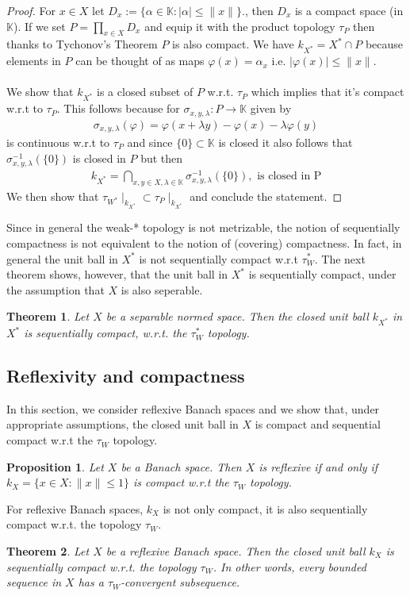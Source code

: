 \documentclass[11pt,a4paper]{article}
\newtheorem{thm}{Theorem}[section]
\newtheorem{prop}{Proposition}[section]
\theoremstyle{definition}
\begin{document}
\begin{proof}
For $x \in X$ let $D_x:= \lbrace \alpha \in \mathbb{K}: | \alpha | \leq \|x\| \rbrace$., then $D_x$ is a compact space (in $\mathbb{K}$). If we set $P= \prod_{x \in X} D_x$ and equip it with the product topology $\tau_P$ then thanks to Tychonov's Theorem $P$ is also compact. We have $k_{X^*} = X^* \cap P$ because elements in $P$ can be thought of as maps $\varphi(x)= \alpha_x$ i.e. $| \varphi(x)| \leq \|x\|$. \\\\
We show that $k_{X^*}$ is a closed subset of $P$ w.r.t. $\tau_P$ which implies that it's compact w.r.t to $\tau_P$. This follows because for $\sigma_{x,y, \lambda}:P \to \mathbb{K}$ given by 
\begin{align*}
\sigma_{x,y, \lambda} ( \varphi)= \varphi(x+ \lambda y)- \varphi(x)- \lambda \varphi(y)
\end{align*}
is continuous w.r.t to $\tau_P$ and since $\lbrace 0 \rbrace \subset \mathbb{K}$ is closed it also follows that $\sigma_{x,y, \lambda}^{-1}( \{0 \})$ is closed in $P$ but then 
\begin{align*}
k_{X^*} = \bigcap_{x,y \in X, \lambda \in \mathbb{K}} \sigma_{x,y, \lambda}^{-1}(\{0 \}), \text{ is closed in P}
\end{align*}
We then show that $ \tau_{W^*} \mid_{k_{X^*}} \subset \tau_P \mid_{k_{X^*}}$ and conclude the statement. 
\end{proof}
\noindent Since in general the weak-* topology is not metrizable, the notion of sequentially compactness is not equivalent to the notion of (covering) compactness. In fact, in general the unit ball in $X^*$ is not sequentially compact w.r.t $\tau_W^*$. The next theorem shows, however, that the unit ball in $X^*$ is sequentially compact, under the assumption that $X$ is also seperable. 
\begin{thm} Let $X$ be a separable normed space. Then the closed unit ball $k_{X^*}$ in $X^*$ is sequentially compact, w.r.t. the $\tau_W^*$ topology. 
\end{thm}
\subsection{Reflexivity and compactness}
In this section, we consider reflexive Banach spaces and we show that, under appropriate assumptions, the closed unit ball in $X$ is compact and sequential compact w.r.t the $\tau_W$ topology. 
\begin{prop} Let $X$ be a Banach space. Then $X$ is reflexive if and only if $k_X= \lbrace x \in X : \|x\| \leq 1\rbrace$ is compact w.r.t the $\tau_W$ topology. 
\end{prop}
\noindent For reflexive Banach spaces, $k_X$ is not only compact, it is also sequentially compact w.r.t. the topology $\tau_W$. 
\begin{thm} Let $X$ be a reflexive Banach space. Then the closed unit ball $k_X$ is sequentially compact w.r.t. the topology $\tau_W$. In other words, every bounded sequence in $X$ has a $\tau_W$-convergent subsequence. 
\end{thm}
\end{document}
